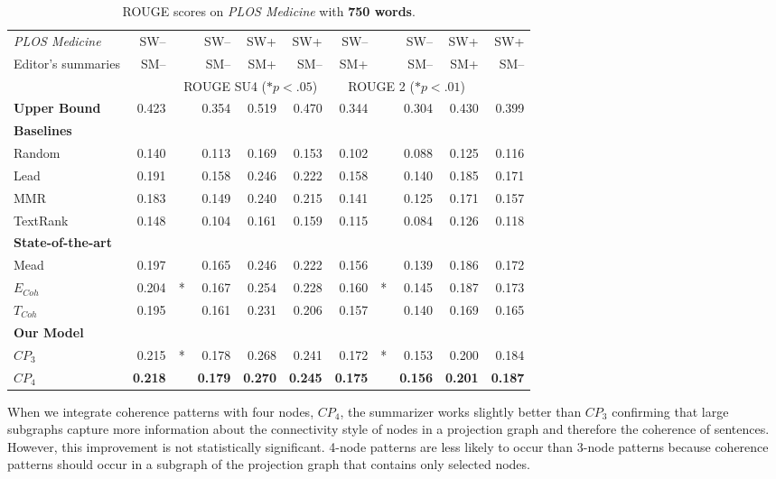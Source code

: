 \begin{table*}[!ht]
\centering
\small
\begin{tabular}{@{}l|r@{}l|r|r|r||r@{}l|r|r|r@{}}
\hline
\emph{PLOS Medicine}& SW--& & SW-- & SW+ & SW+& SW-- & & SW-- & SW+ & SW+ \\
Editor's summaries  & SM-- & & SM-- &  SM+ & SM-- &  SM+  & & SM-- &  SM+  & SM-- \\\hline
&& \multicolumn{4}{c||}{ROUGE SU4 ($\ast p<.05$)} & \multicolumn{4}{c}{ROUGE 2 ($\ast p<.01$)}\\\hline
\textbf{Upper Bound} & 0.423 & & 0.354 &0.519 &0.470  & 0.344 & & 0.304 & 0.430 & 0.399  \\\hline
 \textbf{Baselines} & & & & & & & & & &\\
Random &  0.140& & 0.113 & 0.169  & 0.153 &  0.102 & & 0.088 & 0.125 & 0.116 \\
Lead & 0.191 & & 0.158 & 0.246 & 0.222  & 0.158 & & 0.140 &0.185 &0.171   \\
MMR & 0.183& & 0.149 & 0.240 & 0.215 & 0.141 & & 0.125 & 0.171 &0.157 \\
TextRank & 0.148& & 0.104 & 0.161 & 0.159 & 0.115 & & 0.084 &0.126 & 0.118\\\hline
\textbf{State-of-the-art} & & & & & & & & & & \\
Mead & 0.197 & & 0.165 & 0.246 & 0.222& 0.156 & &0.139 & 0.186 & 0.172 \\
$E_{Coh}$ & 0.204&* & 0.167 & 0.254& 0.228 &0.160 &* & 0.145 &0.187 & 0.173\\
$T_{Coh}$\ & 0.195 & &0.161 & 0.231 &0.206 & 0.157 &  & 0.140 &0.169 & 0.165 \\\hline
\textbf{Our Model} & & & & & & & & & &\\
$CP_3$ &0.215& * &0.178& 0.268& 0.241& 0.172 & * & 0.153 & 0.200 &0.184 \\
$CP_4$ & \textbf{0.218}& & \textbf{0.179} & \textbf{0.270} & \textbf{0.245}  & \textbf{0.175} & & \textbf{0.156} & \textbf{0.201} & \textbf{0.187} \\
\hline
\end{tabular}
\caption{ROUGE scores on \emph{PLOS Medicine} with \textbf{750 words}.}
\label{tab:plos_rougesu4}
\end{table*}

When we integrate coherence patterns with four nodes, $CP_4$, the summarizer works slightly better than $CP_3$ confirming that large subgraphs capture more information about the connectivity style of nodes in a projection graph and therefore the coherence of sentences.  
However, this improvement is not statistically significant. 
4-node patterns are less likely to occur than 3-node patterns because coherence patterns should occur in a subgraph of the projection graph that contains only selected nodes. 

